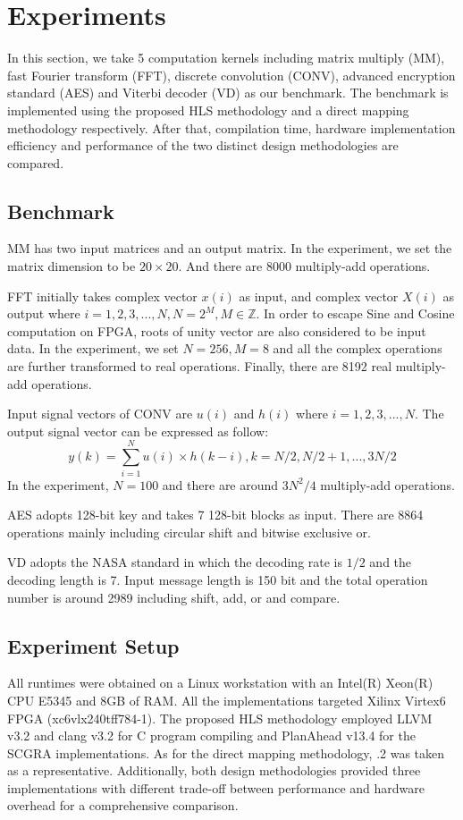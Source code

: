 \section{Experiments}\label{sec:results}
In this section, we take 5 computation kernels including matrix multiply (MM), fast Fourier transform (FFT), discrete convolution (CONV), advanced encryption standard (AES) and Viterbi decoder (VD) as our benchmark. The benchmark is implemented using the proposed HLS methodology and a direct mapping methodology respectively. After that, compilation time, hardware implementation efficiency and performance of the two distinct design methodologies are compared.

\subsection{Benchmark}
MM has two input matrices and an output matrix. In the experiment, we set the matrix dimension to be $20 \times 20$. And there are 8000 multiply-add operations.

FFT initially takes complex vector $x \left( i \right)$ as input, and complex vector $X \left( i \right)$ as output where $i=1,2,3,...,N,N=2^M, M \in \mathbb{Z}$. In order to escape Sine and Cosine computation on FPGA, roots of unity vector are also considered to be input data. In the experiment, we set $N=256,M=8$ and all the complex operations are further transformed to real operations. Finally, there are 8192 real multiply-add operations.

Input signal vectors of CONV are $u \left( i \right)$ and $h \left( i \right)$ where $i=1,2,3,...,N$. The output signal vector can be expressed as follow: \begin{displaymath} y \left( k \right) = \sum_{i=1}^N {u \left( i \right) \times h \left( k-i \right),k=N/2,N/2+1,...,3N/2} \end{displaymath} In the experiment, $N=100$ and there are around $3N^2/4$ multiply-add operations.

AES adopts 128-bit key and takes 7 128-bit blocks as input. There are 8864 operations mainly including circular shift and bitwise exclusive or.

VD adopts the NASA standard in which the decoding rate is $1/2$ and the decoding length is 7. Input message length is 150 bit and the total operation number is around 2989 including shift, add, or and compare.

\subsection{Experiment Setup}
All runtimes were obtained on a Linux workstation with an Intel(R) Xeon(R) CPU E5345 and 8GB of RAM. All the implementations targeted Xilinx Virtex6 FPGA (xc6vlx240tff784-1). The proposed HLS methodology employed LLVM v3.2 and clang v3.2 for C program compiling and PlanAhead v13.4 for the SCGRA implementations. As for the direct mapping methodology, .2 was taken as a representative. Additionally, both design methodologies provided three implementations with different trade-off between performance and hardware overhead for a comprehensive comparison.


